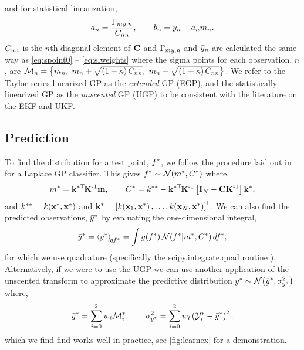 \documentclass{article} %
\begin{document}
and for statistical linearization,
\begin{equation}
    a_n = \frac{\Gamma_{my,n}}{C_{nn}},
    \qquad
    b_n = \bar{y}_n - a_nm_n.
\end{equation}
$C_{nn}$ is the $n$th diagonal element of $\mathbf{C}$ and
$\Gamma_{my,n}$ and $\bar{y}_n$ are calculated the same way as
\eqref{eq:spoint0} -- \eqref{eq:slweights} where the sigma points for each
observation, $n$, are $\mathcal{M}_{n} = \big\{m_n,~m_n +
\sqrt{\left({1 + \kappa}\right)C_{nn}},~m_n - \sqrt{\left({1 +
        \kappa}\right)C_{nn}}\big\}$. We refer to the Taylor series linearized
GP as the \emph{extended} GP (EGP), and the statistically linearized GP as the
\emph{unscented} GP (UGP) to be consistent with the literature on the EKF and
UKF.


\subsection{Prediction}

To find the distribution for a test point, $f^{*}$, we follow the
procedure laid out in \cite{Rasmussen2006} for a Laplace GP classifier. This
gives $f^{*} \sim \mathcal{N}\!\left({m^{*}, C^{*}}\right)$ where,
\begin{equation}
    m^{*} = \mathbf{k}^{*\top}\!\mathbf{K}^{\text{-}1}\mathbf{m},
    \qquad
    C^{*} = k^{**} - \mathbf{k}^{*\top}\!\mathbf{K}^{\text{-}1}\left[{\mathbf{I}_{N} -
        \mathbf{C}\mathbf{K}^{\text{-}1}}\right]\mathbf{k}^{*},
\end{equation}
and $k^{**} = k\!\left({\mathbf{x}^{*}, \mathbf{x}^{*}}\right)$ and $\mathbf{k}^{*}
= \left[{k\!\left({\mathbf{x}_1, \mathbf{x}^{*}}\right), \ldots, k\!\left({\mathbf{x}_N,
        \mathbf{x}^{*}}\right)}\right]^{\!\top}$. We can also find the predicted observations,
$\bar{y}^{*}$ by evaluating the one-dimensional integral,
\begin{equation}
    \bar{y}^{*} = \left\langle{\ensuremath{y}\ensuremath{^{*}}}\right\rangle_{\!{qf^{*}}} = \int
        g\!\left({{f^{*}}}\right) \mathcal{N}\!\left({f^{*}}\middle\vert{\ensuremath{m}\ensuremath{^{*}},
            \ensuremath{C}\ensuremath{^{*}}}\right) df^{*},
\end{equation}
for which we use quadrature (specifically the scipy.integrate.quad routine
\cite{JonesScipy}). Alternatively, if we were to use the UGP we can use another
application of the unscented transform to approximate the predictive
distribution $y^{*} \sim \mathcal{N}\!\left({\bar{y}^{*}, \sigma^2_{y^{*}}}\right)$ where,
\begin{equation}
    \bar{y}^{*} = \sum^2_{i=0} w_i \mathcal{M}_i^{*}, \qquad 
    \sigma^2_{y^{*}} = \sum^2_{i=0} w_i \left({\mathcal{Y}_i^{*} -
        \bar{y}^{*}}\right)^2.
    \label{eq:slpred}
\end{equation}
which we find find works well in practice, see \autoref{fig:learnex} for a
demonstration.
\end{document}

